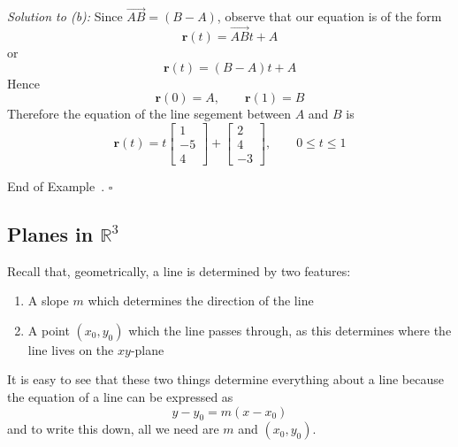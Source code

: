 \documentclass[10pt]{article}
\theoremstyle{definition}
\newtheorem{example}[theorem]{Example}
\renewenvironment{example}
{\begin{oldexample}}
  {\par\smallskip\hfill   End of Example~\theexample. $\square$    \par\end{oldexample}}
\newcommand{\1}[1]{\textbf{1}_{\left[#1\right]}} %
\begin{document}
\begin{example}
  \textit{Solution to (b):} Since $\overrightarrow{AB}=(B-A)$, observe that our
  equation is of the form
  \begin{equation*}
    \boldsymbol{r}(t) = \overrightarrow{AB}t+A
  \end{equation*}
  or
  \begin{equation*}
    \boldsymbol{r}(t)  = (B-A)t+A
  \end{equation*}
  Hence
  \begin{equation*}
    \boldsymbol{r}(0) =A, \qquad \boldsymbol{r}(1) = B
  \end{equation*}
  Therefore the equation of the line segement between $A$ and $B$ is
  \begin{equation*}
    \boldsymbol{r}(t)
    = t
    \begin{bmatrix}
      1\\-5\\4
    \end{bmatrix}
    +
    \begin{bmatrix}
      2\\4\\-3
    \end{bmatrix},
    \qquad
    0 \leq t \leq 1
  \end{equation*}
\end{example}

\subsection{Planes in $\mathbb{R}^{3}$}
Recall that, geometrically, a line is determined by two features:
\begin{enumerate}
  \item A slope $m$ which determines the direction of the line
  \item A point $(x_{0},y_{0})$ which the line passes through, as this
  determines where the line lives on the $xy$-plane
\end{enumerate}
It is easy to see that these two things determine everything about a line
because the equation of a line can be expressed as
\begin{equation*}
  y-y_{0} = m(x-x_{0})
\end{equation*}
and to write this down, all we need are $m$ and $(x_{0},y_{0}).$
\end{document}
